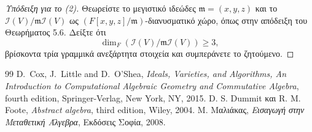 \documentclass[12pt,a4paper,reqno]{amsart}
\theoremstyle{definition}
\newcommand{\fm}{\mathfrak{m}}
\newcommand{\iI}{\mathcal{I}}
\begin{document}
\begin{proof}[Υπόδειξη για το (2)]
  Θεωρείστε το μεγιστικό ιδεώδες $\fm = (x, y, z)$ και  το $\iI(V)/\fm\iI(V)$ ως $(F[x,y,z]/\fm)$-διανυσματικό χώρο, όπως στην απόδειξη του Θεωρήματος 5.6. Δείξτε ότι 
  \[
  \dim_F\left(
    \iI(V)/\fm\iI(V)
  \right) \ge 3,
  \]
  βρίσκοντα τρία γραμμικά ανεξάρτητα στοιχεία και συμπεράνετε το ζητούμενο.
\end{proof}

\begin{thebibliography}{99}
    D.~Cox, J.~Little and D.~O'Shea,
    \textit{Ideals, Varieties, and Algorithms, An Introduction to Computational Algebraic Geometry and Commutative Algebra},
    fourth edition, Springer-Verlag, New York, NY, 2015.
    D. S. Dummit και R. M. Foote, 
    \textit{Abstract algebra},
    third edition, Wiley, 2004. 
    Μ. Μαλιάκας, 
    \textit{Εισαγωγή στην Μεταθετική Άλγεβρα}, 
    Εκδόσεις Σοφία, 2008.
\end{thebibliography}
\end{document}
